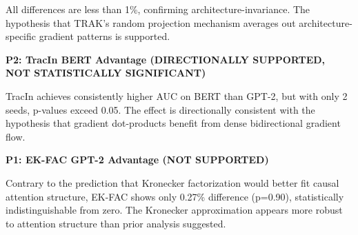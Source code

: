 All differences are less than 1\%, confirming architecture-invariance. The hypothesis that TRAK's random projection mechanism averages out architecture-specific gradient patterns is supported.

\textbf{P2: TracIn BERT Advantage (DIRECTIONALLY SUPPORTED, NOT STATISTICALLY SIGNIFICANT)}

\begin{table}[htbp]
\centering
{}
\end{table}

TracIn achieves consistently higher AUC on BERT than GPT-2, but with only 2 seeds, p-values exceed 0.05. The effect is directionally consistent with the hypothesis that gradient dot-products benefit from dense bidirectional gradient flow.

\textbf{P1: EK-FAC GPT-2 Advantage (NOT SUPPORTED)}

\begin{table}[htbp]
\centering
{}
\end{table}

Contrary to the prediction that Kronecker factorization would better fit causal attention structure, EK-FAC shows only 0.27\% difference (p=0.90), statistically indistinguishable from zero. The Kronecker approximation appears more robust to attention structure than prior analysis suggested.

